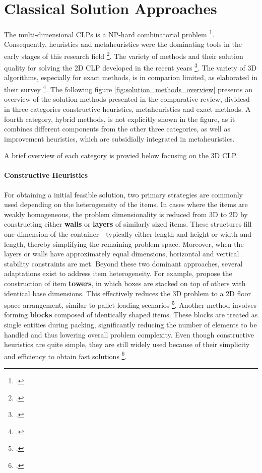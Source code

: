 \chapter{Classical Solution Approaches}
\label{sec:classical_solution_approaches}
The multi-dimensional \gls{CLP}s is a NP-hard combinatorial problem \footcite[cf.][p.11]{bortfeldt_constraints_2013}.
Consequently, heuristics and metaheuristics were the dominating tools
in the early stages of this research field  \footcite[cf.][]{pisinger_heuristics_2002}. The variety of methods
and their solution quality for solving the 2D \gls{CLP} developed in the recent years \footcite[cf.][p.23]{iori_exact_2021}.
The variety of 3D algorithms, especially for exact methods, is in comparion limited, as
\citeauthor*{zhao_comparative_2016} elaborated in their survey \footcite[cf.][]{zhao_comparative_2016}.
The following figure \ref{fig:solution_methods_overview} presents an overview of the solution methods
presented in the comparative review, dividesd in three categories constructive heuristics, metaheuristics
and exact methods. A fourth category, hybrid methods, is not explicitly shown in the figure, as it combines different
components from the other three categories, as well as improvement heuristics, which are subsidially
integrated in metaheuristics.



A brief overview of each category is provied below focusing on the 3D \gls{CLP}.

\subsubsection{Constructive Heuristics}
For obtaining a initial feasible solution, two primary strategies are commonly
used depending on the heterogeneity of the items. In cases where the items are weakly homogeneous,
the problem dimensionality is reduced from 3D to 2D by constructing either
\textbf{walls} or \textbf{layers} of similarly sized items. These structures fill one
dimension of the container—typically either length and height or width and length, thereby
simplifying the remaining problem space. Moreover, when the layers or walls have
approximately equal dimensions, horizontal and vertical stability constraints are met.
Beyond these two dominant approaches, several adaptations exist to address item heterogeneity.
For example, \citeauthor{gehring_genetic_1997} propose the construction of item
\textbf{towers}, in which boxes are stacked on top of others with identical base dimensions.
This effectively reduces the 3D problem to a 2D floor space arrangement,
similar to pallet-loading scenarios \footcite[cf.][pp. 402--406]{gehring_genetic_1997}.
Another method involves forming \textbf{blocks} composed of identically shaped items.
These blocks are treated as single entities
during packing, significantly reducing the number of elements to be handled and thus
lowering overall problem complexity. Even though constructive heuristics are quite simple,
they are still widely used because of their simplicity and efficiency to obtain fast solutions
\footcite[cf.][pp. 11--13]{tamke_branch-and-cut_2024}.

